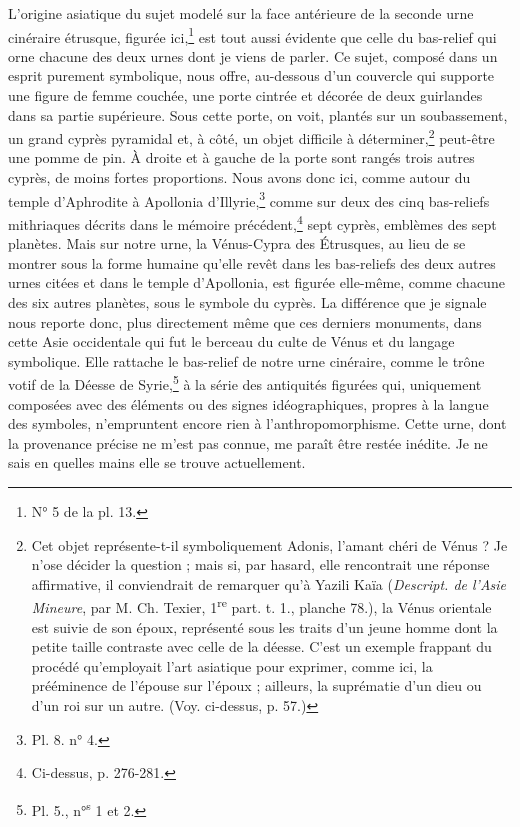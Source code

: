\documentclass{article}
\begin{document}
L'origine asiatique du sujet modelé sur la face antérieure de la seconde urne cinéraire étrusque, figurée ici,\footnote{N° 5 de la pl. 13.} est tout aussi évidente que celle du bas-relief qui orne chacune des deux urnes dont je viens de parler. Ce sujet, composé dans un esprit purement symbolique, nous offre, au-dessous d'un couvercle qui supporte une figure de femme couchée, une porte cintrée et décorée de deux guirlandes dans sa partie supérieure. Sous cette porte, on voit, plantés sur un soubassement, un grand cyprès pyramidal et, à côté, un objet difficile à déterminer,\footnote{Cet objet représente-t-il symboliquement Adonis, l'amant chéri de Vénus ? Je n'ose décider la question ; mais si, par hasard, elle rencontrait une réponse affirmative, il conviendrait de remarquer qu'à Yazili Kaïa (\emph{Descript. de l'Asie Mineure}, par M. Ch. Texier, 1\textsuperscript{re} part. t. 1., planche 78.), la Vénus orientale est suivie de son époux, représenté sous les traits d'un jeune homme dont la petite taille contraste avec celle de la déesse. C'est un exemple frappant du procédé qu'employait l'art asiatique pour exprimer, comme ici, la prééminence de l'épouse sur l'époux ; ailleurs, la suprématie d'un dieu ou d'un roi sur un autre. (Voy. ci-dessus, p. 57.)} peut-être une pomme de pin. À droite et à gauche de la porte sont rangés trois autres cyprès, de moins fortes proportions. Nous avons donc ici, comme autour du temple d'Aphrodite à Apollonia d'Illyrie,\footnote{Pl. 8. n° 4.} comme sur deux des cinq bas-reliefs mithriaques décrits dans le mémoire précédent,\footnote{Ci-dessus, p. 276-281.} sept cyprès, emblèmes des sept planètes. Mais sur notre urne, la Vénus-Cypra des Étrusques, au lieu de se montrer sous la forme humaine qu'elle revêt dans les bas-reliefs des deux autres urnes citées et dans le temple d'Apollonia, est figurée elle-même, comme chacune des six autres planètes, sous le symbole du cyprès. La différence que je signale nous reporte donc, plus directement même que ces derniers monuments, dans cette Asie occidentale qui fut le berceau du culte de Vénus et du langage symbolique. Elle rattache le bas-relief de notre urne cinéraire, comme le trône votif de la Déesse de Syrie,\footnote{Pl. 5., n°\textsuperscript{s} 1 et 2.} à la série des antiquités figurées qui, uniquement composées avec des éléments ou des signes idéographiques, propres à la langue des symboles, n'empruntent encore rien à l'anthropomorphisme. Cette urne, dont la provenance précise ne m'est pas connue, me paraît être restée inédite. Je ne sais en quelles mains elle se trouve actuellement.
\end{document}
